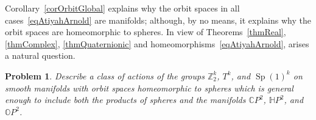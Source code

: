 \documentclass[english, 12pt]{amsproc}
\newcounter{problcounter}
\numberwithin{equation}{section}
\theoremstyle{plain}
\newtheorem{probl}[problcounter]{Problem}
\theoremstyle{definition}
\theoremstyle{remark}
\DeclareMathOperator{\Sp}{Sp}
\newcommand{\Zo}{\mathbb{Z}}
\newcommand{\Zt}{\Zo_2}
\newcommand{\CP}{\mathbb{C}P}
\newcommand{\HP}{\mathbb{H}P}
\newcommand{\OP}{\mathbb{O}P}
\begin{document}
Corollary~\ref{corOrbitGlobal} explains why the orbit spaces in all cases~\eqref{eqAtiyahArnold} are manifolds; although, by no means, it explains why the orbit spaces are homeomorphic to spheres. In view of Theorems~\ref{thmReal}, \ref{thmComplex}, \ref{thmQuaternionic} and homeomorphisms~\ref{eqAtiyahArnold}, arises a natural question.

\begin{probl}
Describe a class of actions of the groups $\Zt^k$, $T^k$, and $\Sp(1)^k$ on smooth manifolds with orbit spaces homeomorphic to spheres which is general enough to include both the products of spheres and the manifolds $\CP^2$, $\HP^2$, and $\OP^2$.
\end{probl}



%
\end{document}
